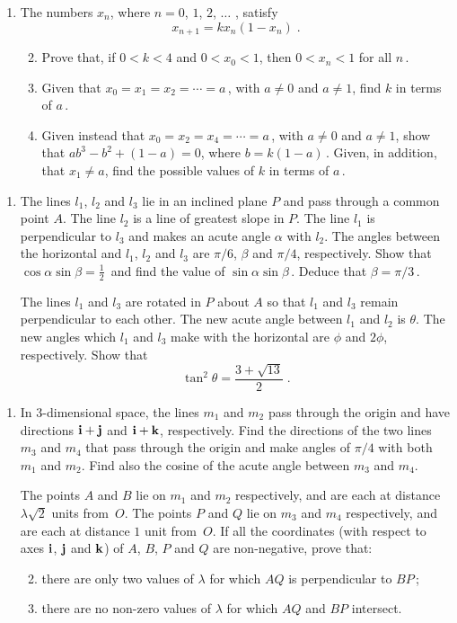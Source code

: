\documentclass[a4, 11pt]{report}
\newlength{\qspace}
\newcounter{qnumber}
\newenvironment{question}%
 {\vspace{\qspace}
  \begin{enumerate}[\bfseries 1\quad][10]%
    \setcounter{enumi}{\value{qnumber}}%
    \item%
 }
{
  \end{enumerate}
  \filbreak
  \stepcounter{qnumber}
 }
\newenvironment{questionparts}[1][1]%
 {
  \begin{enumerate}[\bfseries (i)]%
    \setcounter{enumii}{#1}
    \addtocounter{enumii}{-1}
    \setlength{\itemsep}{5mm}
    \setlength{\parskip}{8pt}
 }
 {
  \end{enumerate}
 }
\begin{document}
\begin{question}
The numbers $x_n$,  where $n=0$, $1$, $2$, $\ldots$ , satisfy 
\[
x_{n+1} = kx_n(1-x_n) \;.
\]

\begin{questionparts}
\item Prove that, if $0<k<4$ and $0<x_0<1$, then $0<x_n<1$ for all $n\,$.
\item Given that $x_0=x_1=x_2 = \cdots =a\,$, with  $a\ne0$ and $a\ne1$, find
$k$ in terms of $a\,$.
\item Given instead that $x_0=x_2=x_4 = \cdots = a\,$, with   $a\ne0$ and $a\ne1$,
show that $ab^3 -b^2 +(1-a)=0$, where $b=k(1-a)\,$. Given, in addition, that
$x_1 \ne a$, find the possible values of $k$ in terms of $a\,$.
\end{questionparts}
	\end{question}
	
\begin{question}
The lines $l_1$, $l_2$ and $l_3$ lie in an inclined plane $P$ and    pass through 
a common point $A$.  The line $l_2$ is a
line of greatest slope in $P$.  The line $l_1$ is  perpendicular to $l_3$ and
makes an acute angle $\alpha$ with $l_2$.
The angles between the horizontal and 
$l_1$, $l_2$  and $l_3$ are  $\pi/6$, $\beta$  and $\pi/4$, respectively. 
Show that $\cos\alpha\sin\beta = \frac12\,$
and find the value of $\sin\alpha \sin\beta\,$. Deduce that 
$\beta = \pi/3\,$.

The lines $l_1$ and $l_3$ are rotated in $P$ about 
$A$ so that $l_1$ and $l_3$ remain perpendicular to each other.
The new acute angle between
$l_1$ and $l_2$ is $\theta$.  The new angles which $l_1$ and $l_3$
 make with the horizontal are $\phi$ and $2\phi$, respectively.  Show that
\[
             \tan^2\theta = \frac{3+\sqrt{13}}2\;.
\]

\end{question}
	
\begin{question}
In 3-dimensional space, the lines $m_1$ and $m_2$ pass through the origin and 
have directions $\bf i + j$ and $\bf i +k $, respectively. Find the directions  of
the two lines $m_3$ and $m_4$  that  pass through the origin and make
angles of $\pi/4$   with both $m_1$ and $m_2$. Find also the cosine of the 
acute angle between $m_3$ and $m_4$.

The points $A$ and $B$ lie on $m_1$ and $m_2$ respectively, and are each at 
distance $\lambda \surd2$ units from~$O$. The points $P$ and $Q$ 
lie on $m_3$ and $m_4$ respectively, and are each at 
distance $1$ unit from~$O$. 
If all the coordinates (with respect to axes $\bf i$, $\bf j$ and $\bf k$)
 of $A$, $B$, $P$ and $Q$ are non-negative, prove that:
\begin{questionparts}
\item there are only two values of $\lambda$ for which $AQ$ is perpendicular
to $BP\,$;
\item there are no non-zero values of $\lambda$ for which $AQ$ and $BP$
intersect.
\end{questionparts}
\end{question}
		
\end{document}
